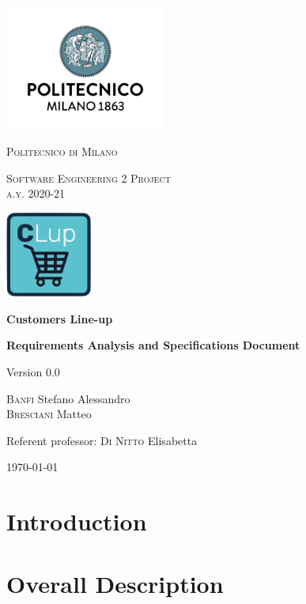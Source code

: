 \documentclass[fontsize=11pt,paper=a4,pagesize=auto]{report}
\begin{document}
\begin{titlepage}
	\centering
	\includegraphics[width=150pt]{images/polimi.jpg}\par\vspace{1cm}
	{\scshape\LARGE
		Politecnico di Milano\par}
	\vspace{0.2cm}
	{\scshape\Large
		Software Engineering 2 Project\\
		a.y. 2020-21\par}
			\vspace{0.5cm}
		\includegraphics[width=80pt]{images/CLup_logo.png}\par
	{\huge\bfseries
		Customers Line-up\\\par}

	{\Large\bfseries
		Requirements Analysis and Specifications Document\par}
	Version 0.0\par
	\vspace{1cm}
	{\Large
		{\scshape Banfi}  Stefano Alessandro\\
		{\scshape Bresciani} Matteo\par}
	\vfill
	Referent professor: {\scshape Di Nitto} Elisabetta\par
	\vfill
	{\large\today\par}
\end{titlepage}


\tableofcontents
\chapter{Introduction}



\chapter{Overall Description}

\end{document}
